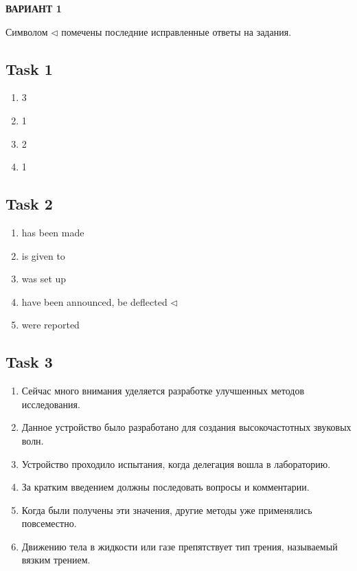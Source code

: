 \begin{center}
	\textbf{ВАРИАНТ 1}
\end{center}

Символом $ \triangleleft $ помечены последние исправленные ответы на задания.

\subsection*{Task 1}

\begin{enumerate}
	\item 3
	\item 1
	\item 2
	\item 1
\end{enumerate}

\subsection*{Task 2}

\begin{enumerate}
	\item has been made
	\item is given to
	\item was set up
	\item have been announced, be deflected $ \triangleleft $
	\item were reported
\end{enumerate}

\subsection*{Task 3}

\begin{enumerate}
	\item Сейчас много внимания уделяется разработке улучшенных методов исследования.
	\item Данное устройство было разработано для создания высокочастотных звуковых волн.
	\item Устройство проходило испытания, когда делегация вошла в лабораторию.
	\item За кратким введением должны последовать вопросы и комментарии.
	\item Когда были получены эти значения, другие методы уже применялись повсеместно.
	\item Движению тела в жидкости или газе препятствует тип трения, называемый вязким трением.
\end{enumerate}

